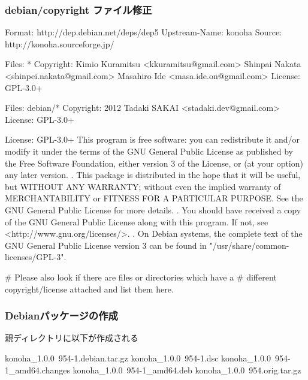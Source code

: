 \documentclass[mingoth,a4paper]{jsarticle}
\begin{document}
\subsubsection{debian/copyright ファイル修正}
\begin{commandline}
Format: http://dep.debian.net/deps/dep5
Upstream-Name: konoha
Source: http://konoha.sourceforge.jp/

Files: *
Copyright: Kimio Kuramitsu <kkuramitsu@gmail.com>
           Shinpai Nakata <shinpei.nakata@gmail.com>
           Masahiro Ide <masa.ide.on@gmail.com>
License: GPL-3.0+

Files: debian/*
Copyright: 2012 Tadaki SAKAI <stadaki.dev@gmail.com>
License: GPL-3.0+

License: GPL-3.0+
 This program is free software: you can redistribute it and/or modify
 it under the terms of the GNU General Public License as published by
 the Free Software Foundation, either version 3 of the License, or
 (at your option) any later version.
 .
 This package is distributed in the hope that it will be useful,
 but WITHOUT ANY WARRANTY; without even the implied warranty of
 MERCHANTABILITY or FITNESS FOR A PARTICULAR PURPOSE.  See the
 GNU General Public License for more details.
 .
 You should have received a copy of the GNU General Public License
 along with this program. If not, see <http://www.gnu.org/licenses/>.
 .
 On Debian systems, the complete text of the GNU General
 Public License version 3 can be found in "/usr/share/common-licenses/GPL-3".

# Please also look if there are files or directories which have a
# different copyright/license attached and list them here.
\end{commandline}

\subsubsection{Debianパッケージの作成}

親ディレクトリに以下が作成される
\begin{commandline}
konoha_1.0.0~954-1.debian.tar.gz
konoha_1.0.0~954-1.dsc
konoha_1.0.0~954-1_amd64.changes
konoha_1.0.0~954-1_amd64.deb
konoha_1.0.0~954.orig.tar.gz
\end{commandline}

\clearpage
\end{document}
